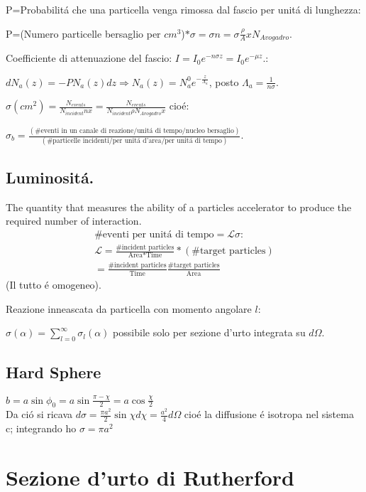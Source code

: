 \documentclass[main.tex]{subfiles}
\begin{document}
P=Probabilit\'a che una particella venga rimossa dal fascio per unit\'a di lunghezza:

P=(Numero particelle bersaglio per $cm^3$)$*\sigma=\sigma n=\sigma \frac{\rho}{A}xN_{Avogadro}$.

Coefficiente di attenuazione del fascio: $I=I_0e^{-n\sigma z}=I_0e^{-\mu z}$.:

$dN_a(z)=-PN_a(z)dz \Rightarrow N_a(z)=N_a^0e^{-\frac{z}{\Lambda_a}}$, posto $\Lambda_a=\frac{1}{n\sigma}$.

$\sigma({cm}^2)=\frac{N_{events}}{N_{incident}nx}=\frac{N_{events}}{N_{incident}\rho N_{Avogadro}x}$ cio\'e:


$\sigma_b=\frac{(\# \text{eventi in un canale di reazione}/\text{unit\'a di tempo}/\text{nucleo bersaglio})}{(\# \text{particelle incidenti}/\text{per unit\'a d'area}/\text{per unit\'a di tempo})}$.

\subsection{Luminosit\'a.}
The quantity that measures the ability of a particles accelerator to produce the required number of interaction.
\begin{align*}
\# \text{eventi per unit\'a di tempo}=\mathcal{L}\sigma:\\
 \mathcal{L}=\frac{\text{\# incident particles}}{\text{Area}*\text{Time}}*(\text{\# target particles})\\
 =\frac{\text{\# incident particles}}{\text{Time}}\frac{\text{\# target particles}}{\text{Area}}
\end{align*}
(Il tutto \'e omogeneo).

Reazione inneascata da particella con momento angolare $l$: 

$\sigma(\alpha)=\sum_{l=0}^\infty \sigma_l(\alpha)$ possibile solo per sezione d'urto integrata su $d\Omega$.



\subsection{Hard Sphere}
$b=a\sin{\phi_0}=a\sin{\frac{\pi-\chi}{2}}=a\cos{\frac{\chi}{2}}$\\Da ci\'o si ricava $d\sigma=\frac{\pi a^2}{2}\sin{\chi}d\chi=\frac{a^2}{4}d\Omega$ cio\'e la diffusione \'e isotropa nel sistema c; integrando ho $\sigma=\pi a^2$

\section{Sezione d'urto di Rutherford}
\end{document}
